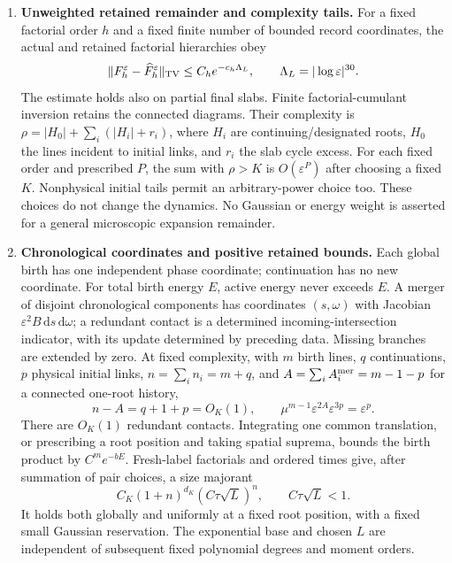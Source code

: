 \documentclass[11pt,letterpaper]{article}
\numberwithin{equation}{section}
\theoremstyle{definition}\newtheorem{assumption}[theorem]{Assumption}
\theoremstyle{remark}\newtheorem{remark}[theorem]{Remark}
\newcommand{\eps}{\varepsilon}\newcommand{\dd}{\,\mathrm d}
\begin{document}
\begin{enumerate}[label=H\arabic*.,ref=H\arabic*,leftmargin=2.7em]
\item\label{imp:unweighted} \textbf{Unweighted retained remainder and complexity tails.}
For a fixed factorial order $h$ and a fixed finite number of bounded record coordinates, the actual and retained factorial hierarchies obey
\begin{equation}\label{eq:unweighted}
 \|F_h^\eps-\widehat F_h^\eps\|_{\TV}
 \le C_h e^{-c_h\Lambda_L},\qquad \Lambda_L=|\log\eps|^{30}.
\end{equation}
The estimate holds also on partial final slabs. Finite factorial-cumulant inversion retains the connected diagrams. Their complexity is
$\rho=|H_0|+\sum_i(|H_i|+r_i)$, where $H_i$ are continuing/designated roots, $H_0$ the lines incident to initial links, and $r_i$ the slab cycle excess. For each fixed order and prescribed $P$, the sum with $\rho>K$ is $O(\eps^P)$ after choosing a fixed $K$. Nonphysical initial tails permit an arbitrary-power choice too. These choices do not change the dynamics. No Gaussian or energy weight is asserted for a general microscopic expansion remainder.

\item\label{imp:majorant} \textbf{Chronological coordinates and positive retained bounds.}
Each global birth has one independent phase coordinate; continuation has no new coordinate. For total birth energy $E$, active energy never exceeds $E$. A merger of disjoint chronological components has coordinates $(s,\omega)$ with Jacobian $\eps^2 B\dd s\dd\omega$; a redundant contact is a determined incoming-intersection indicator, with its update determined by preceding data. Missing branches are extended by zero. At fixed complexity, with $m$ birth lines, $q$ continuations, $p$ physical initial links, $n=\sum_i n_i=m+q$, and $A=\sum_i A_i^{\rm mer}=m-1-p$ for a connected one-root history,
\[
 n-A=q+1+p=O_K(1),\qquad
 \mu^{m-1}\eps^{2A}\eps^{3p}=\eps^p.
\]
There are $O_K(1)$ redundant contacts. Integrating one common translation, or prescribing a root position and taking spatial suprema, bounds the birth product by $C^m e^{-bE}$. Fresh-label factorials and ordered times give, after summation of pair choices, a size majorant
\begin{equation}\label{eq:majorant}
 C_K(1+n)^{d_K}(C\tau\sqrt L)^n,\qquad C\tau\sqrt L<1.
\end{equation}
It holds both globally and uniformly at a fixed root position, with a fixed small Gaussian reservation. The exponential base and chosen $L$ are independent of subsequent fixed polynomial degrees and moment orders.


\end{enumerate}
\end{document}
